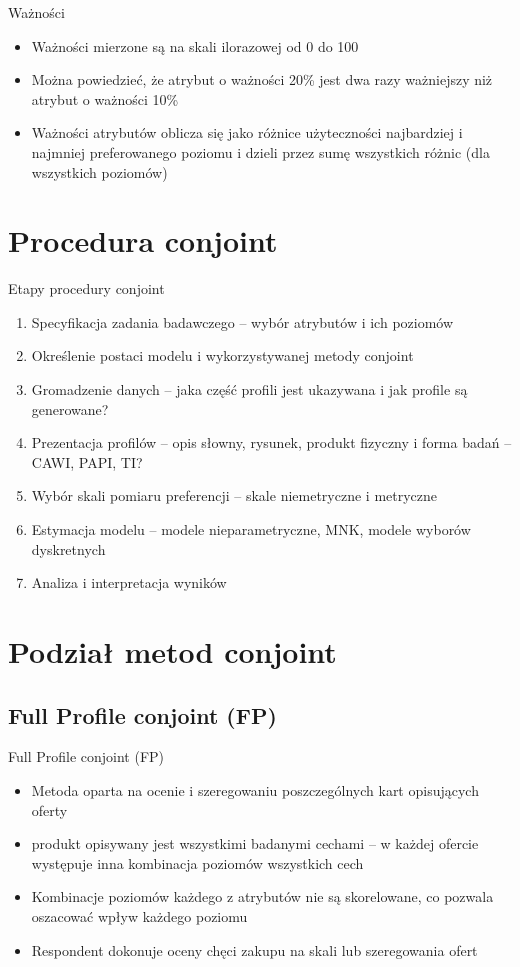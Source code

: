 \documentclass{beamer}
\begin{document}
\begin{frame}{Ważności}
  \begin{itemize}
  \item Ważności mierzone są na skali ilorazowej od 0 do 100
  \item Można powiedzieć, że atrybut o ważności 20\% jest dwa razy ważniejszy niż atrybut o ważności 10\%
  \item Ważności atrybutów oblicza się jako różnice użyteczności najbardziej i najmniej preferowanego poziomu i dzieli przez sumę wszystkich różnic (dla wszystkich poziomów)
  \end{itemize}
\end{frame}

\section{Procedura conjoint}

\begin{frame}{Etapy procedury conjoint}
  \begin{enumerate}
  \item Specyfikacja zadania badawczego -- wybór atrybutów i ich poziomów
  \item Określenie postaci modelu i wykorzystywanej metody conjoint
  \item Gromadzenie danych -- jaka część profili jest ukazywana i jak profile są generowane?
  \item Prezentacja profilów -- opis słowny, rysunek, produkt fizyczny i forma badań -- CAWI, PAPI, TI?
  \item Wybór skali pomiaru preferencji -- skale niemetryczne i metryczne
  \item Estymacja modelu -- modele nieparametryczne, MNK, modele wyborów dyskretnych
  \item Analiza i interpretacja wyników
  \end{enumerate}
\end{frame}

\section{Podział metod conjoint}
\subsection{Full Profile conjoint (FP)}
\begin{frame}{Full Profile conjoint (FP)}
  \begin{itemize}
  \item Metoda oparta na ocenie i szeregowaniu poszczególnych kart opisujących oferty
  \item produkt opisywany jest wszystkimi badanymi cechami -- w każdej ofercie występuje inna kombinacja poziomów wszystkich cech
  \item Kombinacje poziomów każdego z atrybutów nie są skorelowane, co pozwala oszacować wpływ każdego poziomu
  \item Respondent dokonuje oceny chęci zakupu na skali lub szeregowania ofert
  \end{itemize}
\end{frame}
\end{document}
